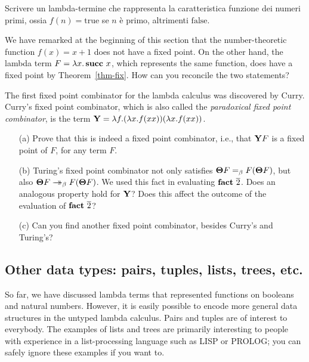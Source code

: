 \documentclass{article}
\begin{document}
\begin{exercise}
  Scrivere un lambda-termine che rappresenta la caratteristica
  funzione dei numeri primi, ossia $f(n)=\mbox{true}$ se $n$ \`e
  primo, altrimenti $\mbox{false}$. 
\end{exercise}

\begin{exercise}
  We have remarked at the beginning of this section that
  the number-theoretic function $f(x)=x+1$ does not have a
  fixed point. On the other hand, the lambda term $F=\lambda x.\mathop{\textbf{\bf succ}\,} x$,
  which represents the same function, does have a fixed point by
  Theorem~\ref{thm-fix}. How can you reconcile the two statements?
\end{exercise}

\begin{exercise}
  The first fixed point combinator for the lambda calculus was discovered
  by Curry.  Curry's fixed point combinator, which is also called the
  {\em paradoxical fixed point combinator}, is the term ${\bf Y}=\lambda f.(\lambda
  x.f(xx))(\lambda x.f(xx))$.
  \begin{enumerate}
  \item[(a)] Prove that this is indeed a fixed point combinator, i.e.,
    that ${\bf Y} F$ is a fixed point of $F$, for any term $F$. 
  \item[(b)] Turing's fixed point combinator not only satisfies $\textbf{\boldmath $\Theta$}
    F=_{\beta} F(\textbf{\boldmath $\Theta$} F)$, but also $\textbf{\boldmath $\Theta$} F\mathrel{\rightarrow\!\!\!\!\!\rightarrow}_{\beta} F(\textbf{\boldmath $\Theta$} F)$. We
    used this fact in evaluating $\mathop{\textbf{\bf fact}\,}\mathop{\overline{2}}$. Does an analogous
    property hold for ${\bf Y}$? Does this affect the outcome of the
    evaluation of $\mathop{\textbf{\bf fact}\,}\mathop{\overline{2}}$?
  \item[(c)] Can you find another fixed point combinator, besides Curry's
    and Turing's?
  \end{enumerate}
\end{exercise}

\subsection{Other data types: pairs, tuples, lists, trees, etc.}

So far, we have discussed lambda terms that represented functions on
booleans and natural numbers. However, it is easily possible to encode more
general data structures in the untyped lambda calculus. Pairs and
tuples are of interest to everybody. The examples of lists and trees
are primarily interesting to people with experience in a
list-processing language such as LISP or PROLOG; you can safely ignore
these examples if you want to.
\end{document}
